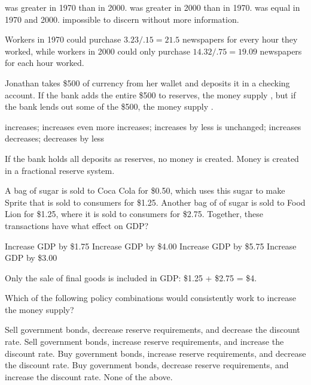 \documentclass[addpoints,11pt]{exam}
\theoremstyle{definition}
\newcommand{\blank}[0]{\underline{\hspace{3cm}}}
\begin{document}
\begin{questions}
	\begin{choices}
		\CorrectChoice was greater in 1970 than in 2000.
		\choice was greater in 2000 than in 1970.
		\choice was equal in 1970 and 2000.
		\choice impossible to discern without more information.
	\end{choices}
	
	\begin{solution}
		 Workers in 1970 could purchase $3.23/.15 = 21.5$ newspapers for every hour they worked, while workers in 2000 could only purchase $14.32/.75 = 19.09$ newspapers for each hour worked.
	\end{solution}
	
\newpage

\question Jonathan takes \$500 of currency from her wallet and deposits it in a checking account. If the bank adds the entire \$500 to reserves, the money supply \blank, but if the bank lends out some of the \$500, the money supply \blank.

\begin{choices}
	\choice increases; increases even more
	\choice increases; increases by less
	\CorrectChoice is unchanged; increases
	\choice decreases; decreases by less
\end{choices}

\begin{solution} 
	If the bank holds all deposits as reserves, no money is created. Money is created in a fractional reserve system.
\end{solution}

	
\question A bag of sugar is sold to Coca Cola for \$0.50, which uses this sugar to make Sprite that is sold to consumers for \$1.25. Another bag of of sugar is sold to Food Lion for \$1.25, where it is sold to consumers for \$2.75. Together, these transactions have what effect on GDP?

\begin{choices}
	\choice Increase GDP by \$1.75
	\CorrectChoice Increase GDP by \$4.00
	\choice Increase GDP by \$5.75
	\choice Increase GDP by \$3.00
\end{choices}

\begin{solution} 
	Only the sale of final goods is included in GDP: \$1.25 + \$2.75 = \$4.
\end{solution}
	
	\question Which of the following policy combinations would consistently work to increase the money supply?
	
	\begin{choices}
		\choice Sell government bonds, decrease reserve requirements, and decrease the discount rate.
		\choice Sell government bonds, increase reserve requirements, and increase the discount rate.
		\choice Buy government bonds, increase reserve requirements, and decrease the discount rate.
		\choice Buy government bonds, decrease reserve requirements, and increase the discount rate.
		\CorrectChoice None of the above.
	\end{choices}
	

\end{questions}
\end{document}
